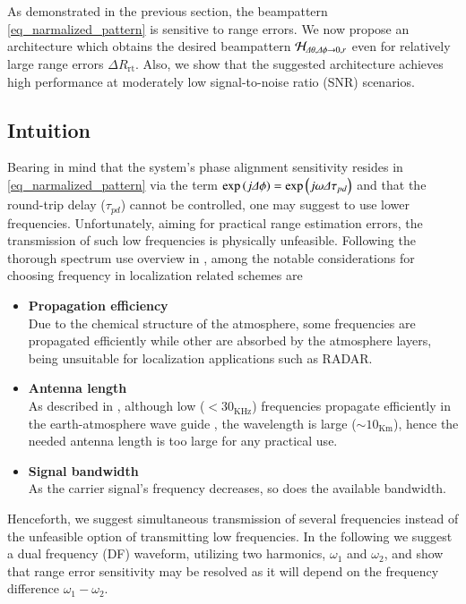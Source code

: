 As demonstrated in the previous section, the beampattern \eqref{eq_narmalized_pattern} is sensitive to range errors.
We now propose an architecture which obtains the desired beampattern $\mathcal{H}_{\Delta\theta,\Delta\phi\to0,r}$ even for relatively large range errors $\Delta R_{\text{rt}}$. Also, we show that the suggested architecture achieves high performance at moderately low signal-to-noise ratio (SNR) scenarios.

\subsection{Intuition}
Bearing in mind that the system's phase alignment sensitivity resides in \eqref{eq_narmalized_pattern} via the  term $\exp\left({j\Delta\phi}\right)=\exp\left({j\omega\Delta\tau_{pd}}\right)$ and that the round-trip delay ($\tau_{pd}$) cannot be controlled, one may suggest to use lower frequencies. 
Unfortunately, aiming for practical range estimation errors, the transmission of such low frequencies is physically unfeasible.
Following the thorough spectrum use overview in \cite{barclay2003propagation}, among the notable considerations for choosing frequency in localization related schemes are
\begin{itemize}
    \item \textbf{Propagation efficiency}\\
    Due to the chemical structure of the atmosphere, some frequencies are propagated efficiently while other are absorbed \cite{wen2015foundations} by the atmosphere layers, being unsuitable for localization applications such as RADAR.
    \item \textbf{Antenna length}\\
    As described in \cite{barclay2003propagation}, although low ($<30_{\text{KHz}}$) frequencies propagate efficiently in the earth-atmosphere wave guide \cite{wen2015foundations}, the wavelength is large ($\sim10_{\text{Km}}$), hence the needed antenna length is too large for any practical use.
    \item \textbf{Signal bandwidth}\\
    As the carrier signal's frequency decreases, so does the available bandwidth.
\end{itemize}
Henceforth, we suggest simultaneous transmission of several frequencies instead of the unfeasible option of transmitting low frequencies. 
In the following we suggest a dual frequency (DF) waveform, utilizing two harmonics, $\omega_1$ and $\omega_2$, and show that range error sensitivity may be resolved  as it will depend on the frequency difference $\omega_{1}-\omega_{2}$.

